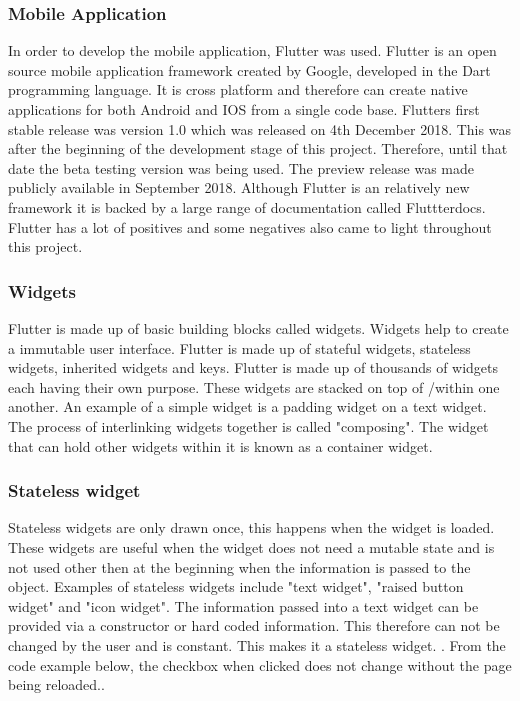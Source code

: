 \subsubsection{Mobile Application}
In order to develop the mobile application, Flutter was used. Flutter is an open source mobile application framework created by Google, developed in the Dart programming language. It is cross platform and therefore can create native applications for both Android and IOS from a single code base. Flutters first stable release was version 1.0 which was released on 4th December 2018. This was after the beginning of the development stage of this project. Therefore, until that date the beta testing version was being used. The preview release was made publicly available in September 2018. Although Flutter is an relatively new framework it is backed by a large range of documentation called Fluttterdocs. Flutter has a lot of positives and some negatives also came to light throughout this project.

\subsubsection{Widgets}
Flutter is made up of basic building blocks called widgets. Widgets help to create a immutable user interface. Flutter is made up of stateful widgets, stateless widgets, inherited widgets and keys. Flutter is made up of thousands of widgets each having their own purpose. These widgets are stacked on top of /within one another. An example of a simple widget is a padding widget on a text widget. The process of interlinking widgets together is called "composing". The widget that can hold other widgets within it is known as a container widget.\cite{widgets}

\subsubsection{Stateless widget}
Stateless widgets are only drawn once, this happens when the widget is loaded. These widgets are useful when the widget does not need a mutable state and is not used other then at the beginning when the information is passed to the object. Examples of stateless widgets include "text widget", "raised button widget" and "icon widget". The information passed into a text widget can be provided via a constructor or hard coded information. This therefore can not be changed by the user and is constant. This makes it a stateless widget. \cite{birch_2019}. From the code example below, the checkbox when clicked does not change without the page being reloaded.\cite{stateful_widgets_2018}.

